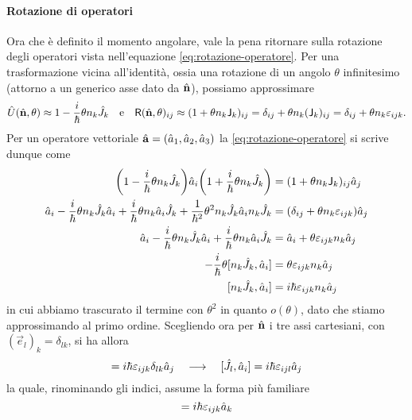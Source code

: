 \paragraph{Rotazione di operatori}
Ora che è definito il momento angolare, vale la pena ritornare sulla rotazione degli operatori vista nell'equazione \eqref{eq:rotazione-operatore}.
Per una trasformazione vicina all'identità, ossia una rotazione di un angolo $\theta$ infinitesimo (attorno a un generico asse dato da $\hat{\mathbf{n}}$), possiamo approssimare
\begin{equation}
	\hat{U}(\hat{\mathbf{n}},\theta)\approx 1-\frac{i}{\hbar}\theta n_k\hat{J}_k
	\quad\text{e}\quad
	\mathsf{R}(\hat{\mathbf{n}},\theta)_{ij}\approx(1+\theta n_k\mathsf{J}_k)_{ij}=\delta_{ij}+\theta n_k(\mathsf{J}_k)_{ij}=\delta_{ij}+\theta n_k\varepsilon_{ijk}.
\end{equation}
Per un operatore vettoriale $\hat{\mathbf{a}}=(\hat{a}_1,\hat{a}_2,\hat{a}_3)$ la \eqref{eq:rotazione-operatore} si scrive dunque come
\begin{equation}
	\begin{aligned}
		\bigg(1-\frac{i}{\hbar}\theta n_k\op J_k\bigg)\op a_i\bigg(1+\frac{i}{\hbar}\theta n_k\op J_k\bigg)&=(1+\theta n_k\Ang_k)_{ij}\op a_j\\
		\op a_i-\frac{i}{\hbar}\theta n_k\op J_k\op a_i+\frac{i}{\hbar}\theta n_k\op a_i\op J_k+\frac1{\hbar^2}\theta^2n_k\op J_k\op a_in_k\op J_k&=(\delta_{ij}+\theta n_k\epsilon_{ijk})\op a_j\\
		\op a_i-\frac{i}{\hbar}\theta n_k\op J_k\op a_i+\frac{i}{\hbar}\theta n_k\op a_i\op J_k&=\op a_i+\theta\epsilon_{ijk}n_k\op a_j\\
		-\frac{i}{\hbar}\theta[n_k\op J_k,\op a_i]&=\theta\epsilon_{ijk}n_k\op a_j\\
		[n_k\op J_k,\op a_i]&=i\hbar\epsilon_{ijk}n_k\op a_j
	\end{aligned}
\end{equation}
in cui abbiamo trascurato il termine con $\theta^2$ in quanto $o(\theta)$, dato che stiamo approssimando al primo ordine.
Scegliendo ora per $\hat{\mathbf{n}}$ i tre assi cartesiani, con $(\vec e_l)_k=\delta_{lk}$, si ha allora
\begin{equation}
	[\delta_{lk}\op J_k,\op a_i]=i\hbar\epsilon_{ijk}\delta_{lk}\op a_j
	\qqq
	[\op J_l,\op a_i]=i\hbar\epsilon_{ijl}\op a_j
\end{equation}
la quale, rinominando gli indici, assume la forma più familiare
\begin{equation}
	[\op J_i,\op a_j]=i\hbar\epsilon_{ijk}\op a_k
	\label{eq:rotazione-operatori-vettoriali-commutatore}
\end{equation}
